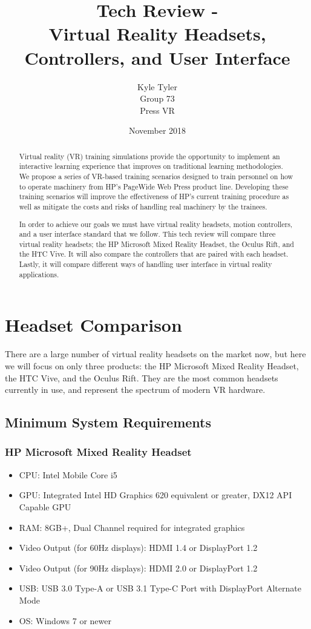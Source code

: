 \documentclass[onecolumn, draftclsnofoot,10pt, compsoc]{IEEEtran}
\title{ Tech Review - \\ 
        Virtual Reality Headsets, Controllers, and User Interface
}
\author{Kyle Tyler \\ 
        Group 73 \\
        Press VR}
\date{November 2018}
\begin{document}
\maketitle

\begin{abstract}
\normalsize
Virtual reality (VR) training simulations provide the opportunity to implement an interactive learning experience that improves on traditional learning methodologies. We propose a series of VR-based training scenarios designed to train personnel on how to operate machinery from HP’s PageWide Web Press product line. Developing these training scenarios will improve the effectiveness of HP’s current training procedure as well as mitigate the costs and risks of handling real machinery by the trainees.

In order to achieve our goals we must have virtual reality headsets, motion controllers, and a user interface standard that we follow. This tech review will compare three virtual reality headsets; the HP Microsoft Mixed Reality Headset, the Oculus Rift, and the HTC Vive. It will also compare the controllers that are paired with each headset. Lastly, it will compare different ways of handling user interface in virtual reality applications.
\end{abstract}

\newpage
\section{Headset Comparison}
There are a large number of virtual reality headsets on the market now, but here we will focus on only three products: the HP Microsoft Mixed Reality Headset, the HTC Vive, and the Oculus Rift. They are the most common headsets currently in use, and represent the spectrum of modern VR hardware.

\subsection{Minimum System Requirements}

\subsubsection{HP Microsoft Mixed Reality Headset}
\begin{itemize}
    \item CPU: Intel Mobile Core i5
    \item GPU: Integrated Intel HD Graphics 620 equivalent or greater, DX12 API Capable GPU
    \item RAM: 8GB+, Dual Channel required for integrated graphics
    \item Video Output (for 60Hz displays): HDMI 1.4 or DisplayPort 1.2
    \item Video Output (for 90Hz displays): HDMI 2.0 or DisplayPort 1.2 
    \item USB: USB 3.0 Type-A or USB 3.1 Type-C Port with DisplayPort Alternate Mode
    \item OS: Windows 7 or newer
\end{itemize}
\end{document}
